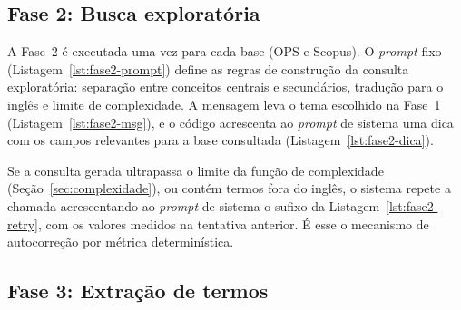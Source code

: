 \documentclass[12pt, a4paper]{article}
\begin{document}




  \subsection{Fase 2: Busca exploratória}

  A Fase~2 é executada uma vez para cada base (OPS e Scopus). O
\textit{prompt} fixo (Listagem~\ref{lst:fase2-prompt}) define as regras de
construção da consulta exploratória: separação entre conceitos centrais e
secundários, tradução para o inglês e limite de complexidade. A mensagem leva
o tema escolhido na Fase~1 (Listagem~\ref{lst:fase2-msg}), e o código
acrescenta ao \textit{prompt} de sistema uma dica com os campos relevantes
para a base consultada (Listagem~\ref{lst:fase2-dica}).







  Se a consulta gerada ultrapassa o limite da função de complexidade
(Seção~\ref{sec:complexidade}), ou contém termos fora do inglês, o sistema
repete a chamada acrescentando ao \textit{prompt} de sistema o sufixo da
Listagem~\ref{lst:fase2-retry}, com os valores medidos na tentativa
anterior. É esse o mecanismo de autocorreção por métrica determinística.



  \subsection{Fase 3: Extração de termos}
\end{document}
